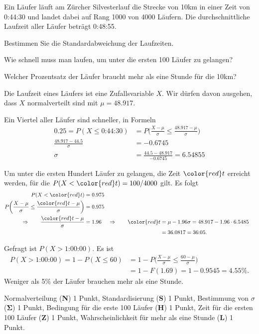 Ein Läufer läuft am Zürcher Silvesterlauf die Strecke von 10km in
einer Zeit von 0:44:30 und landet dabei auf Rang 1000 von 4000 Läufern.
Die durchschnittliche Laufzeit aller Läufer beträgt 0:48:55.
\begin{teilaufgaben}
\item 
Bestimmen Sie die Standardabweichung der Laufzeiten.
\item
Wie schnell muss man laufen, um unter die ersten 100 Läufer zu gelangen?
\item
Welcher Prozentsatz der Läufer braucht mehr als eine Stunde für die 10km?
\end{teilaufgaben}

\begin{loesung}
Die Laufzeit eines Läufers ist eine Zufallsvariable $X$.
Wir dürfen davon ausgehen, dass $X$ normalverteilt sind mit $\mu=48.917$.
\begin{teilaufgaben}
\item 
Ein Viertel aller Läufer sind schneller, in Formeln
\begin{align*}
0.25
=
P(X \le \text{0:44:30})
&=
P\biggl(
\frac{X-\mu}{\sigma} \le \frac{48.917 - \mu}{\sigma}
\biggr)
\\
\frac{48.917 - 44.5}{\sigma}
&=
-0.6745
\\
\sigma
&=
\frac{44.5- 48.917}{-0.6745}
=
6.54855
\end{align*}
\item 
Um unter die ersten Hundert Läufer zu gelangen, die Zeit $\color{red}t$
erreicht werden,
für die $P(X<{\color{red}t})=100/4000$ gilt.
Es folgt
\begin{align*}
P(X<{\color{red}t})
&=
0.975
\\
P\biggl(\frac{X-\mu}{\sigma}\le\frac{{\color{red}t}-\mu}{\sigma}\biggr)
&=
0.975
\\
\Rightarrow\qquad
\frac{{\color{red}t}-\mu}{\sigma}
&=
1.96
&
\Rightarrow\qquad
{\color{red}t}&=\mu - 1.96\sigma
=
48.917 - 1.96\cdot 6.5485
\\
&&&=
36.0817
=
\text{36:05}.
\end{align*}
\item
Gefragt ist $P(X>\text{1:00:00})$.
Es ist
\begin{align*}
P(X>\text{1:00:00})
=1-P(X\le 60)
&=
1- P\biggl(\frac{X-\mu}{\sigma} \le \frac{60-\mu}{\sigma}\biggr)
\\
&=
1 - F(1.69)
=
1-0.9545=4.55\%.
\end{align*}
Weniger als 5\% der Läufer brauchen mehr als eine Stunde.
\qedhere
\end{teilaufgaben}
\end{loesung}

\begin{bewertung}
Normalverteilung ({\bf N}) 1 Punkt,
Standardisierung ({\bf S}) 1 Punkt,
Bestimmung von $\sigma$ ($\mathbf{\Sigma}$) 1 Punkt,
Bedingung für die erste 100 Läufer ({\bf H}) 1 Punkt,
Zeit für die ersten 100 Läufer ({\bf Z}) 1 Punkt,
Wahrscheinlichkeit für mehr als eine Stunde ({\bf L}) 1 Punkt.
\end{bewertung}



